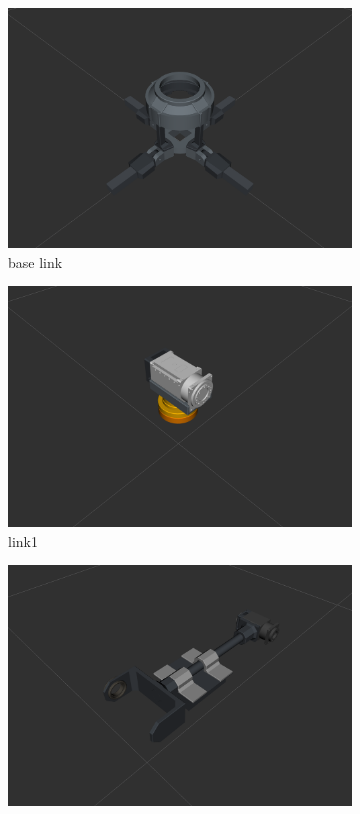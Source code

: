 \begin{figure}
  \centering
  \captionsetup{justification=centering}
  \begin{subfigure}[b]{0.2\linewidth}
    \includegraphics[width=\linewidth]{base.png}
     \caption{base link}
  \end{subfigure}
  \begin{subfigure}[b]{0.2\linewidth}
    \includegraphics[width=\linewidth]{link1.png}
    \caption{link1}
  \end{subfigure}
  \begin{subfigure}[b]{0.2\linewidth}
    \includegraphics[width=\linewidth]{link2.png}

\end{subfigure}
\end{figure}

